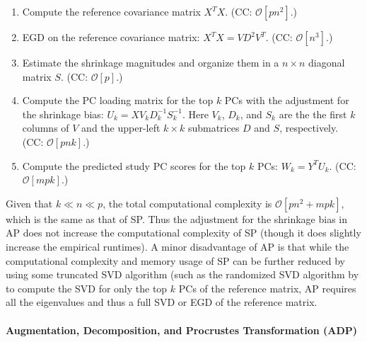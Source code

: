 \documentclass{article}
\newcommand{\bO}{\mathcal{O}}
\begin{document}
\begin{enumerate}
\item Compute the reference covariance matrix $X^T X$.
  (CC: $\bO[pn^2]$.)  
\item EGD on the reference covariance matrix: $X^T X = V D^2 V^T$.
  (CC: $\bO[n^3]$.)
\item Estimate the shrinkage magnitudes and organize them in a $n \times n$ diagonal matrix $S$.
  (CC: $\bO[p]$.)
\item Compute the PC loading matrix for the top $k$ PCs with the adjustment for the shrinkage bias: $U_k= X V_k D_k^{-1} S_k^{-1}$.
Here $V_k$, $D_k$, and $S_k$
are the the first $k$ columns of $V$
and the upper-left $k \times k$ submatrices $D$ and $S$, respectively.
(CC: $\bO[pnk]$.)
\item Compute the predicted study PC scores for the top $k$ PCs: $W_k = Y^T U_k$.
(CC: $\bO[mpk]$.)
\end{enumerate}
Given that $k \ll n \ll p$,
the total computational complexity is $\bO[pn^2 + mpk]$,
which is the same as that of SP.
Thus the adjustment for the shrinkage bias in AP
does not increase the computational complexity of SP
(though it does slightly increase the empirical runtimes).
A minor disadvantage of AP is that
while the computational complexity and memory usage of SP
can be further reduced
by using some truncated SVD algorithm
(such as the randomized SVD algorithm
by \citet{halko2011finding}
to compute the SVD for only the top $k$ PCs of the reference matrix,
AP requires all the eigenvalues
and thus a full SVD or EGD of the reference matrix.

\paragraph{Augmentation, Decomposition, and Procrustes Transformation (ADP)}
\end{document}
